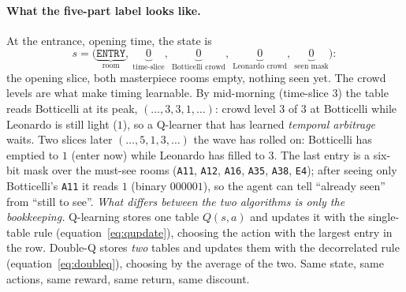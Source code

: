 \documentclass[11pt]{article}
\begin{document}
\paragraph{What the five-part label looks like.} At the entrance, opening time, the state is
\[
s=\bigl(\underbrace{\texttt{ENTRY}}_{\text{room}},\ \underbrace{0}_{\text{time-slice}},\ \underbrace{0}_{\text{Botticelli crowd}},\ \underbrace{0}_{\text{Leonardo crowd}},\ \underbrace{0}_{\text{seen mask}}\bigr):
\]
the opening slice, both masterpiece rooms empty, nothing seen yet. The crowd levels are what make
timing learnable. By mid-morning (time-slice $3$) the table reads Botticelli at its peak,
$(\dots,3,3,1,\dots)$: crowd level $3$ of $3$ at Botticelli while Leonardo is still light ($1$), so a
Q-learner that has learned \emph{temporal arbitrage} waits. Two slices later $(\dots,5,1,3,\dots)$ the
wave has rolled on: Botticelli has emptied to $1$ (enter now) while Leonardo has filled to $3$. The
last entry is a six-bit mask over the must-see rooms (\texttt{A11}, \texttt{A12}, \texttt{A16},
\texttt{A35}, \texttt{A38}, \texttt{E4}); after seeing only Botticelli's \texttt{A11} it reads $1$
(binary $000001$), so the agent can tell ``already seen'' from ``still to see''.
\emph{What differs between the two algorithms is only the bookkeeping.} Q-learning stores one
table $Q(s,a)$ and updates it with the single-table rule (equation~\eqref{eq:qupdate}),
choosing the action with the largest entry in the row. Double-Q stores \emph{two} tables and
updates them with the decorrelated rule (equation~\eqref{eq:doubleq}), choosing by the average
of the two. Same state, same actions, same reward, same return, same discount.
\end{document}
